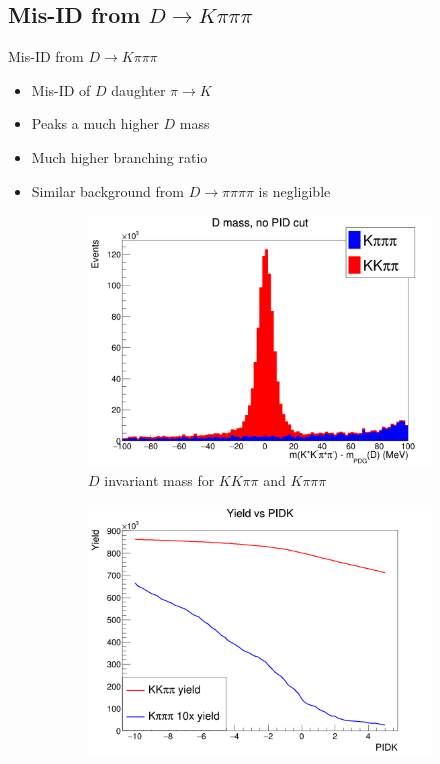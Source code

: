 \documentclass{beamer}
\begin{document}
\subsection{Mis-ID from \texorpdfstring{$D\to K\pi\pi\pi$}{D to Kpipipi}}
\begin{frame}{Mis-ID from $D\to K\pi\pi\pi$}
  \begin{itemize}
    \item{Mis-ID of $D$ daughter $\pi\to K$}
    \item{Peaks a much higher $D$ mass}
    \item{Much higher branching ratio}
    \item{Similar background from $D\to\pi\pi\pi\pi$ is negligible}
  \end{itemize}
  \begin{figure}
    \centering
    \vspace{-0.2cm}
    \begin{subfigure}{0.5\textwidth}
      \includegraphics[width = 1.0\textwidth]{B2DK_Dmass_Background.png}
      \caption{$D$ invariant mass for $KK\pi\pi$ and $K\pi\pi\pi$}
    \end{subfigure}%
    \begin{subfigure}{0.5\textwidth}
      \includegraphics[width = 1.0\textwidth]{YieldVSPIDK.png}

\end{subfigure}
\end{figure}
\end{frame}
\end{document}
